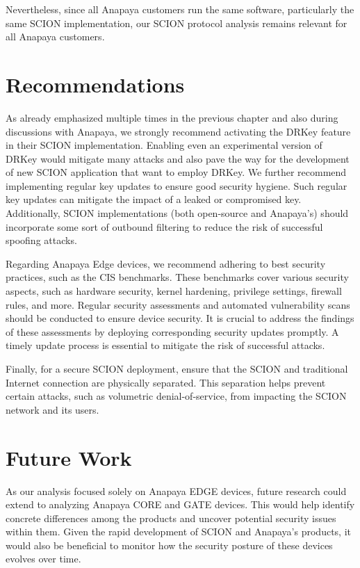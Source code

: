 Nevertheless, since all Anapaya customers run the same software, particularly the same SCION implementation, our SCION protocol analysis remains relevant for all Anapaya customers.


\section{Recommendations}

As already emphasized multiple times in the previous chapter and also during discussions with Anapaya, we strongly recommend activating the DRKey feature in their SCION implementation.
Enabling even an experimental version of DRKey would mitigate many attacks and also pave the way for the development of new SCION application that want to employ DRKey.
We further recommend implementing regular key updates to ensure good security hygiene.
Such regular key updates can mitigate the impact of a leaked or compromised key.
Additionally, SCION implementations (both open-source and Anapaya's) should incorporate some sort of outbound filtering to reduce the risk of successful spoofing attacks.

Regarding Anapaya Edge devices, we recommend adhering to best security practices, such as the CIS benchmarks.
These benchmarks cover various security aspects, such as hardware security, kernel hardening, privilege settings, firewall rules, and more.
Regular security assessments and automated vulnerability scans should be conducted to ensure device security.
It is crucial to address the findings of these assessments by deploying corresponding security updates promptly.
A timely update process is essential to mitigate the risk of successful attacks.

Finally, for a secure SCION deployment, ensure that the SCION and traditional Internet connection are physically separated.
This separation helps prevent certain attacks, such as volumetric denial-of-service, from impacting the SCION network and its users.

\section{Future Work}

As our analysis focused solely on Anapaya EDGE devices, future research could extend to analyzing Anapaya CORE and GATE devices.
This would help identify concrete differences among the products and uncover potential security issues within them.
Given the rapid development of SCION and Anapaya's products, it would also be beneficial to monitor how the security posture of these devices evolves over time.

